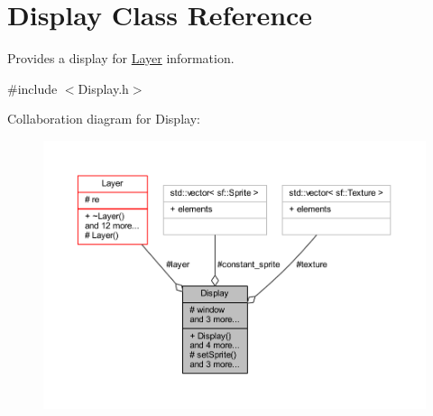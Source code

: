 \hypertarget{class_display}{}\section{Display Class Reference}
\label{class_display}


Provides a display for \hyperlink{class_layer}{Layer} information.  




{\ttfamily \#include $<$Display.\+h$>$}



Collaboration diagram for Display\+:\nopagebreak
\begin{figure}[H]
\begin{center}
\leavevmode
\includegraphics[width=350pt]{class_display__coll__graph}
\end{center}
\end{figure}
